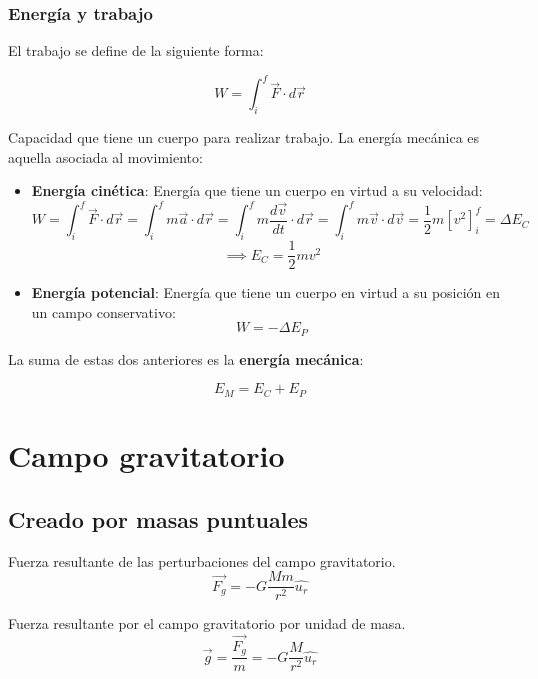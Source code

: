 \documentclass[10pt]{article}
\begin{document}
\subsubsection{Energía y trabajo}

\begin{definition}[Trabajo]
  El trabajo se define de la siguiente forma:

  \[ W = \int_i^f \vec{F} \cdot d\vec{r} \]

\end{definition}

\begin{definition}
  Capacidad que tiene un cuerpo para realizar trabajo. La energía mecánica es aquella asociada al movimiento:

  \begin{itemize}
    \item \textbf{Energía cinética}: Energía que tiene un cuerpo en virtud a su velocidad: 
      \[ W = \int_i^f \vec{F} \cdot d\vec{r} = \int_i^f m\vec{a} \cdot d \vec{r} = \int_i^f m \frac{d\vec{v}}{dt} \cdot d \vec{r} = \int_i^f m \vec{v} \cdot d\vec{v} 
      = \frac{1}{2}m\left[v^2\right]_i^f = \Delta E_C \]
      \[ \implies E_C = \frac{1}{2} m v^2 \]
    \item \textbf{Energía potencial}: Energía que tiene un cuerpo en virtud a su posición en un campo conservativo:
      \[ W = -\Delta E_P \]
  \end{itemize}
  
  La suma de estas dos anteriores es la \textbf{energía mecánica}: 

  \[ E_M = E_C + E_P \]

\end{definition}

\section{Campo gravitatorio}

\subsection{Creado por masas puntuales}

\begin{definition}
  Fuerza resultante de las perturbaciones del campo gravitatorio.
  \[ \vec{F_g} = -G \frac{M m}{r^2} \hat{u_r} \]
\end{definition}

\begin{definition}
  Fuerza resultante por el campo gravitatorio por unidad de masa.
  \[ \vec{g} = \frac{\vec{F_g}}{m} = -G \frac{M}{r^2} \hat{u_r} \]
\end{definition}
\end{document}
